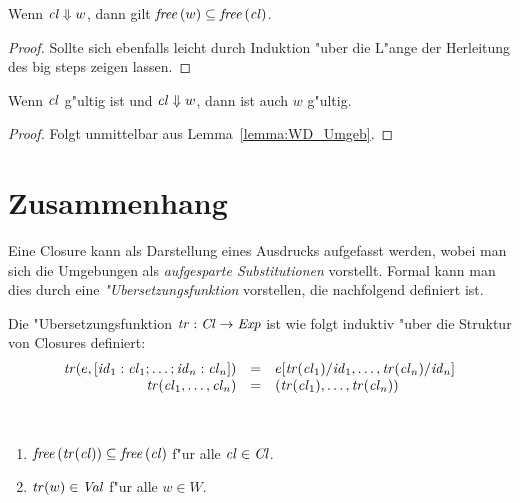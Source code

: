 \documentclass[12pt,fleqn,a4paper]{article}
\newcommand{\Cl}{\name{Cl}}
\newcommand{\cl}{\name{cl}}
\begin{document}
\begin{lemma} \label{lemma:WD_Umgeb}
  Wenn $\cl \Downarrow w$, dann gilt $\free{w} \subseteq \free{\cl}$.
\end{lemma}

\begin{proof}
  Sollte sich ebenfalls leicht durch Induktion "uber die L"ange der Herleitung des big steps zeigen lassen.
\end{proof}

\begin{corollary}
  Wenn $\cl$ g"ultig ist und $\cl \Downarrow w$, dann ist auch $w$ g"ultig.
\end{corollary}

\begin{proof}
  Folgt unmittelbar aus Lemma~\ref{lemma:WD_Umgeb}.
\end{proof}

\section{Zusammenhang}

Eine Closure kann als Darstellung eines Ausdrucks aufgefasst werden, wobei man sich die Umgebungen als
\emph{aufgesparte Substitutionen} vorstellt. Formal kann man dies durch eine \emph{"Ubersetzungsfunktion}
vorstellen, die nachfolgend definiert ist.

\begin{definition}["Ubersetzungsfunktion]
  Die "Ubersetzungsfunktion $\name{tr}:\Cl \to \Exp$ ist wie folgt induktiv "uber die Struktur von Closures
  definiert:
  \[\begin{array}{rcl}
    \tr{e,[\id_1:\cl_1;\ldots;\id_n:\cl_n]} &=& e[\tr{\cl_1}/\id_1,\ldots,\tr{\cl_n}/\id_n] \\
    \tr{\cl_1,\ldots,\cl_n} &=& (\tr{\cl_1},\ldots,\tr{\cl_n}) \\
  \end{array}\]
\end{definition}

\begin{lemma} \
  \begin{enumerate}
  \item $\free{\tr{\cl}} \subseteq \free{\cl}$ f"ur alle $\cl \in \Cl$.
  \item ${\text{\it tr\/}}(w) \in {\text{\it Val\/}}$ f"ur alle $w \in W$.
  \end{enumerate}
\end{lemma}
\end{document}
